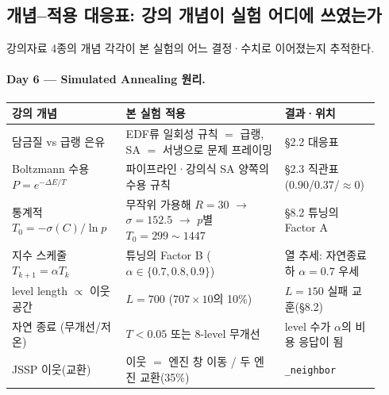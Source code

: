 \documentclass[11pt]{article}
\begin{document}
\subsection{개념--적용 대응표: 강의 개념이 실험 어디에 쓰였는가}

강의자료 4종의 개념 각각이 본 실험의 어느 결정·수치로 이어졌는지 추적한다.

\paragraph{Day 6 — Simulated Annealing 원리.}
\begin{table}[H]\centering\small
\begin{tabular}{p{0.28\linewidth}p{0.40\linewidth}p{0.24\linewidth}}
\toprule
강의 개념 & 본 실험 적용 & 결과·위치 \\
\midrule
담금질 vs 급랭 은유 & EDF류 일회성 규칙 $=$ 급랭, SA $=$ 서냉으로 문제 프레이밍 & \S2.2 대응표 \\
Boltzmann 수용 $P{=}e^{-\Delta E/T}$ & 파이프라인·강의식 SA 양쪽의 수용 규칙 & \S2.3 직관표(0.90/0.37/$\approx$0) \\
통계적 $T_0{=}-\sigma(C)/\ln p$ & 무작위 가용해 $R{=}30$ $\to$ $\sigma{=}152.5$ $\to$ $p$별 $T_0{=}299{\sim}1447$ & \S8.2 튜닝의 Factor A \\
지수 스케줄 $T_{k+1}{=}\alpha T_k$ & 튜닝의 Factor B ($\alpha\in\{0.7,0.8,0.9\}$) & 열 추세: 자연종료 하 $\alpha{=}0.7$ 우세 \\
level length $\propto$ 이웃공간 & $L{=}700$ ($707{\times}10$의 10\%) & $L{=}150$ 실패 교훈(\S8.2) \\
자연 종료 (무개선/저온) & $T{<}0.05$ 또는 8-level 무개선 & level 수가 $\alpha$의 비용 응답이 됨 \\
JSSP 이웃(교환) & 이웃 $=$ 엔진 창 이동 / 두 엔진 교환(35\%) & \texttt{\_neighbor} \\
\bottomrule
\end{tabular}
\end{table}
\end{document}
